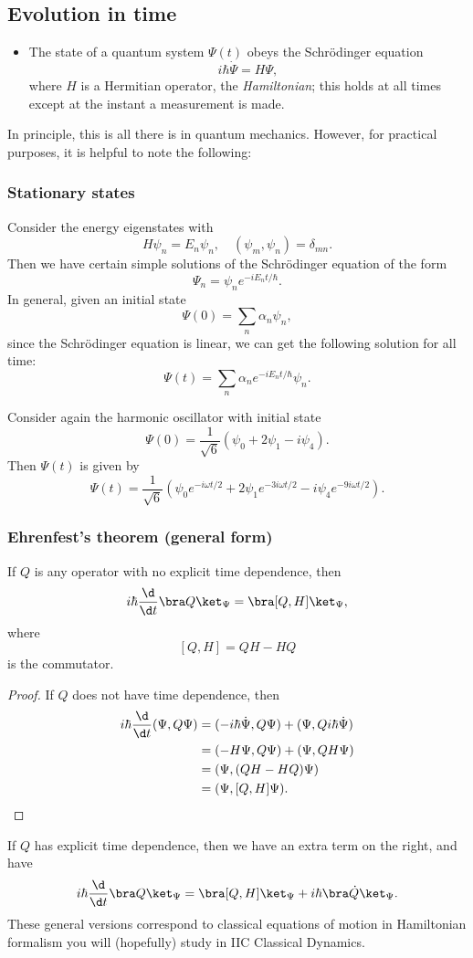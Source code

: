 \documentclass[a4paper]{article}
\begin{document}
\subsection{Evolution in time}
\begin{itemize}
  \item The state of a quantum system $\Psi(t)$ obeys the Schr\"odinger equation
    \[
      i\hbar \dot{\Psi} = H\Psi,
    \]
    where $H$ is a Hermitian operator, the \emph{Hamiltonian}; this holds at all times except at the instant a measurement is made.
\end{itemize}
In principle, this is all there is in quantum mechanics. However, for practical purposes, it is helpful to note the following:

\subsubsection*{Stationary states}
Consider the energy eigenstates with
\[
  H\psi_n = E_n \psi_n,\quad (\psi_m, \psi_n) = \delta_{mn}.
\]
Then we have certain simple solutions of the Schr\"odinger equation of the form
\[
  \Psi_n = \psi_n e^{-iE_n t/\hbar}.
\]
In general, given an initial state
\[
  \Psi(0) = \sum_n \alpha_n \psi_n,
\]
since the Schr\"odinger equation is linear, we can get the following solution for all time:
\[
  \Psi(t) = \sum_n \alpha_n e^{-iE_n t/\hbar} \psi_n.
\]
\begin{eg}
  Consider again the harmonic oscillator with initial state
  \[
    \Psi(0) = \frac{1}{\sqrt{6}}(\psi_0 + 2\psi_1 - i \psi_4).
  \]
  Then $\Psi(t)$ is given by
  \[
    \Psi(t) = \frac{1}{\sqrt{6}} (\psi_0 e^{-i\omega t/2} + 2\psi_1e^{-3i\omega t/2} - i \psi_4 e^{-9i\omega t/2}).
  \]
\end{eg}

\subsubsection*{Ehrenfest's theorem (general form)}
\begin{thm}
  If $Q$ is any operator with no explicit time dependence, then
  \[
    i\hbar \frac{\d}{\d t}\bra Q\ket_\Psi = \bra [Q, H]\ket_\Psi,
  \]
  where
  \[
    [Q, H] = QH - HQ
  \]
  is the commutator.
\end{thm}

\begin{proof}
  If $Q$ does not have time dependence, then
  \begin{align*}
    i\hbar \frac{\d}{\d t}(\Psi, Q\Psi) &= (-i\hbar \dot\Psi, Q\Psi) + (\Psi, Q i\hbar \dot\Psi)\\
    &= (-H\Psi, Q\Psi) + (\Psi, QH \Psi)\\
    &= (\Psi, (QH - HQ)\Psi)\\
    &= (\Psi, [Q, H] \Psi).
  \end{align*}
\end{proof}
If $Q$ has explicit time dependence, then we have an extra term on the right, and have
\[
  i\hbar \frac{\d}{\d t}\bra Q\ket_\Psi = \bra [Q, H]\ket_\Psi + i\hbar \bra \dot{Q} \ket_\Psi.
\]
These general versions correspond to classical equations of motion in Hamiltonian formalism you will (hopefully) study in IIC Classical Dynamics.
\end{document}
